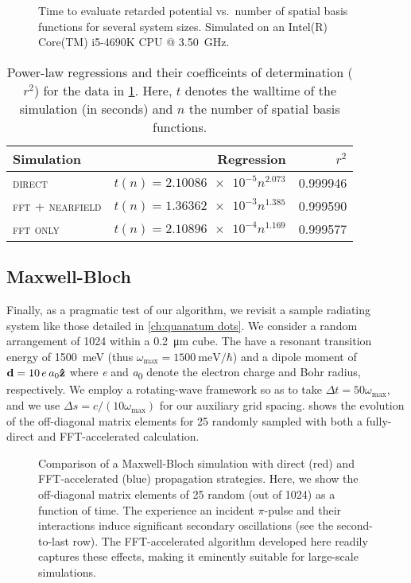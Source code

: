 \begin{figure}
  \centering
  \caption{\label{fig:timing}Time to evaluate retarded potential vs.\ number of spatial basis functions for several system sizes. 
    Simulated on an Intel(R) Core(TM) i5-4690K CPU @ \SI{3.50}{\giga\hertz}.
  }
\end{figure}

\begin{table}
  \centering
  \begin{tabular}{lrr}
    Simulation               & Regression                          & $r^2$ \\ \hline
    \textsc{direct}          & $t(n) = \num{2.10086e-5} n^{2.073}$ & 0.999946 \\
    \textsc{fft + nearfield} & $t(n) = \num{1.36362e-3} n^{1.385}$ & 0.999590 \\
    \textsc{fft only}        & $t(n) = \num{2.10896e-4} n^{1.169}$ & 0.999577
  \end{tabular}
  \caption{\label{table:timing regressions}Power-law regressions and their coefficeints of determination ($r^2$) for the data in \cref{fig:timing}.
    Here, $t$ denotes the walltime of the simulation (in seconds) and $n$ the number of spatial basis functions.
  }
\end{table}

\subsection{Maxwell-Bloch}

Finally, as a pragmatic test of our algorithm, we revisit a sample radiating \qd{} system like those detailed in \cref{ch:quanatum dots}.
We consider a random arrangement of 1024 \qds{} within a \SI{0.2}{\micro\meter} cube.
The \qds{} have a resonant transition energy of \SI{1500}{\milli\eV} (thus $\omega_\text{max} = \SI{1500}{\milli\eV}/\hbar$) and a dipole moment of $\vb{d} = \SI{10}{\elementarycharge\bohr} \vu{z}$ where \si{\elementarycharge} and \si{\bohr} denote the electron charge and Bohr radius, respectively.
We employ a rotating-wave framework so as to take $\Delta t = 50 \omega_\text{max}$, and we use $\Delta s = c/(10 \omega_\text{max})$ for our auxiliary grid spacing.
 shows the evolution of the off-diagonal matrix elements for 25 randomly sampled \qds{} with both a fully-direct and FFT-accelerated calculation.

\begin{figure}
  \centering
  \caption{\label{fig:qd fast comparison}Comparison of a Maxwell-Bloch \qd{} simulation with direct (red) and FFT-accelerated (blue) propagation strategies.
    Here, we show the off-diagonal matrix elements of 25 random \qds{} (out of 1024) as a function of time.
    The \qds{} experience an incident $\pi$-pulse and their interactions induce significant secondary oscillations (see the second-to-last row).
    The FFT-accelerated algorithm developed here readily captures these effects, making it eminently suitable for large-scale \qd{} simulations.
  }
\end{figure}
